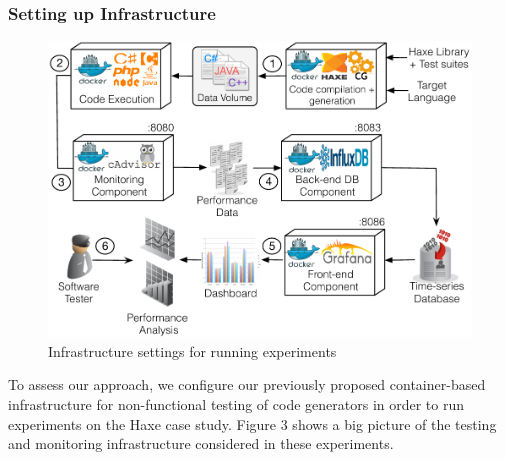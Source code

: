 \subsubsection{Setting up Infrastructure}
\begin{figure}[h]
	\centering
	\includegraphics[width=1\linewidth]{Ressources/settingup.pdf}
	\caption{Infrastructure settings for running experiments}
\end{figure}
To assess our approach, we configure our previously proposed container-based infrastructure for non-functional testing of code generators in order to run experiments on the Haxe case study.
Figure 3 shows a big picture of the testing and monitoring infrastructure considered in these experiments.


